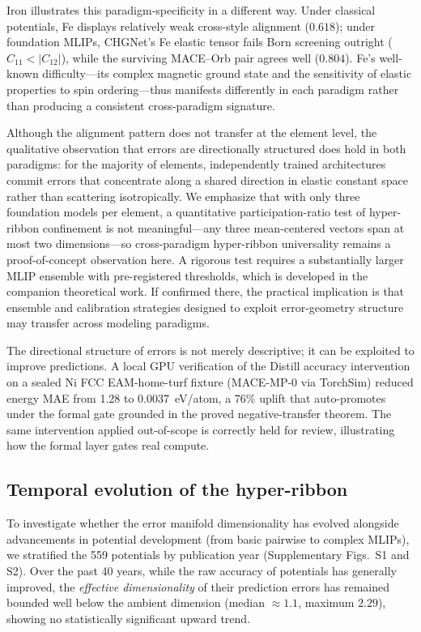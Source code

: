 \documentclass[twocolumn,10pt]{article}
\begin{document}
Iron illustrates this paradigm-specificity in a different way. Under classical potentials, Fe displays relatively weak cross-style alignment ($0.618$); under foundation MLIPs, CHGNet's Fe elastic tensor fails Born screening outright ($C_{11}<|C_{12}|$), while the surviving MACE--Orb pair agrees well ($0.804$). Fe's well-known difficulty---its complex magnetic ground state and the sensitivity of elastic properties to spin ordering---thus manifests differently in each paradigm rather than producing a consistent cross-paradigm signature.

Although the alignment pattern does not transfer at the element level, the qualitative observation that errors are directionally structured does hold in both paradigms: for the majority of elements, independently trained architectures commit errors that concentrate along a shared direction in elastic constant space rather than scattering isotropically. We emphasize that with only three foundation models per element, a quantitative participation-ratio test of hyper-ribbon confinement is not meaningful---any three mean-centered vectors span at most two dimensions---so cross-paradigm hyper-ribbon universality remains a proof-of-concept observation here. A rigorous test requires a substantially larger MLIP ensemble with pre-registered thresholds, which is developed in the companion theoretical work\cite{welcing2026projection}. If confirmed there, the practical implication is that ensemble and calibration strategies designed to exploit error-geometry structure may transfer across modeling paradigms.

The directional structure of errors is not merely descriptive; it can be exploited to improve predictions. A local GPU verification of the Distill accuracy intervention on a sealed Ni FCC EAM-home-turf fixture (MACE-MP-0 via TorchSim) reduced energy MAE from 1.28 to 0.0037~eV/atom, a 76\% uplift that auto-promotes under the formal gate grounded in the proved negative-transfer theorem. The same intervention applied out-of-scope is correctly held for review, illustrating how the formal layer gates real compute.

\subsection{Temporal evolution of the hyper-ribbon}

To investigate whether the error manifold dimensionality has evolved alongside advancements in potential development (from basic pairwise to complex MLIPs), we stratified the 559 potentials by publication year (Supplementary Figs.~S1 and S2). Over the past 40 years, while the raw accuracy of potentials has generally improved, the \textit{effective dimensionality} of their prediction errors has remained bounded well below the ambient dimension (median $\approx 1.1$, maximum $2.29$), showing no statistically significant upward trend.
\end{document}
